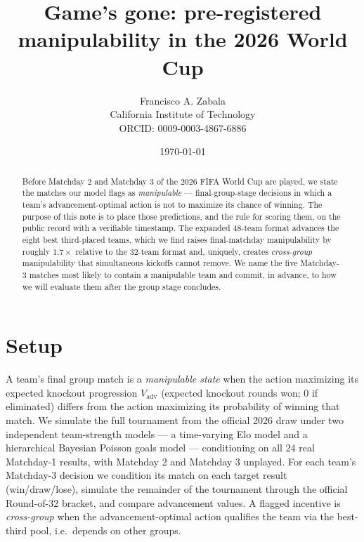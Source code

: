 \documentclass[11pt]{article}
\title{\bfseries Game's gone: pre-registered manipulability in the 2026 World Cup}
\author{Francisco A. Zabala \\ \small California Institute of Technology \\ \small ORCID: 0009-0003-4867-6886}
\date{\today}
\begin{document}
\maketitle

\begin{abstract}
\noindent
Before Matchday 2 and Matchday 3 of the 2026 FIFA World Cup are played, we state the matches our
model flags as \emph{manipulable} --- final-group-stage decisions in which a team's
advancement-optimal action is not to maximize its chance of winning. The purpose of this note is to
place those predictions, and the rule for scoring them, on the public record with a verifiable
timestamp. The expanded 48-team format advances the eight best third-placed teams, which we find
raises final-matchday manipulability by roughly $1.7\times$ relative to the 32-team format and,
uniquely, creates \emph{cross-group} manipulability that simultaneous kickoffs cannot remove. We name
the five Matchday-3 matches most likely to contain a manipulable team and commit, in advance, to how
we will evaluate them after the group stage concludes.
\end{abstract}

\section{Setup}
A team's final group match is a \emph{manipulable state} when the action maximizing its expected
knockout progression $V_{\mathrm{adv}}$ (expected knockout rounds won; $0$ if eliminated) differs from
the action maximizing its probability of winning that match. We simulate the full tournament from the
official 2026 draw under two independent team-strength models --- a time-varying Elo model and a
hierarchical Bayesian Poisson goals model --- conditioning on all $24$ real Matchday-1 results, with
Matchday 2 and Matchday 3 unplayed. For each team's Matchday-3 decision we condition its match on each
target result (win/draw/lose), simulate the remainder of the tournament through the official Round-of-32
bracket, and compare advancement values. A flagged incentive is \emph{cross-group} when the
advancement-optimal action qualifies the team via the best-third pool, i.e.\ depends on other groups.
\end{document}
